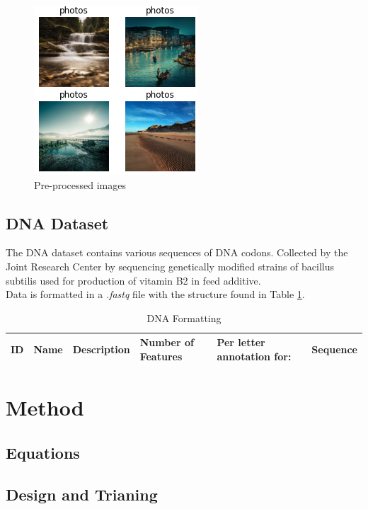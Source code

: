 \documentclass{article}
\begin{document}
	\begin{figure}[h]
		\centering
		\includegraphics[scale=1]{images/landscapes}
		\caption{Pre-processed images}
		\label{fig:landscapes}
	\end{figure}

	
	\subsection{DNA Dataset}
	The DNA dataset contains various sequences of DNA codons. Collected by the Joint Research Center by sequencing genetically modified strains of bacillus subtilis used for production of vitamin B2 in feed additive. \\
	Data is formatted in a {\em .fastq} file with the structure found in Table \ref{tab:dna}.
	
	\begin{table}
		\caption{DNA Formatting}
		\centering
		\begin{tabular}{llllll}
			\toprule
			ID     & Name     & Description & Number of Features & Per letter annotation for: & Sequence \\
			\bottomrule
		\end{tabular}
		\label{tab:dna}
	\end{table}
	
	\section{Method}

	\subsection{Equations}

	\subsection{Design and Trianing}
\end{document}
